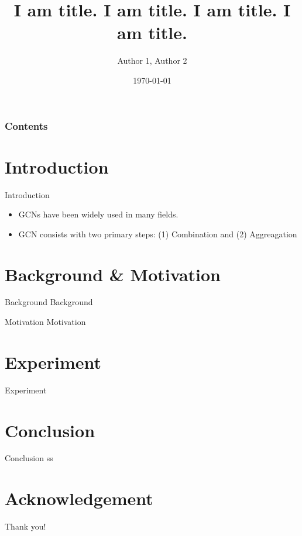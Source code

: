 \documentclass[10pt]{beamer}
\title[Shenzhen University]{I am title. I am title. I am title. I am title. }
\author[Author Name]{Author 1, Author 2 }
\institute[szuxxx@email.szu.edu.cn]{ Shenzhen University\\College of Computer Science and Software Engineering}
\date[Nickname \today]
{\today}
\begin{document}
\frame{\titlepage}
\begin{frame}
\frametitle{Contents}
\tableofcontents
\end{frame}
\section{Introduction}
    \begin{frame}{Introduction}
    
    \begin{itemize}
        \item GCNs have been widely used in many fields. 
        \item GCN consists with two primary steps: (1) Combination and (2) Aggreagation
        
    \end{itemize}
    \end{frame}
\section{Background \& Motivation}
    \begin{frame}{Background}
        Background
    \end{frame}

    \begin{frame}{Motivation}
        Motivation
    \end{frame}

\section{Experiment}
    \begin{frame}{Experiment}
    \end{frame}




\section{Conclusion}
    \begin{frame}{Conclusion}
    ss
    \end{frame}






\section*{Acknowledgement}  
\begin{frame}
\textcolor{myNewColorA}{\Huge{\centerline{Thank you!}}}
\end{frame}
\end{document}
